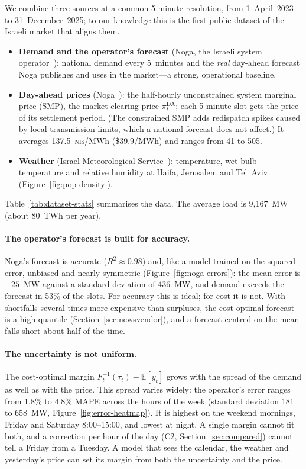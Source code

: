 We combine three sources at a common 5-minute resolution, from 1~April~2023
to 31~December~2025; to our knowledge this is the first public dataset of the
Israeli market that aligns them.

\begin{itemize}
    \item \textbf{Demand and the operator's forecast} (Noga, the Israeli
          system operator~\parencite{noga}): national demand every 5~minutes
          and the \emph{real} day-ahead forecast Noga publishes and uses in
          the market---a strong, operational baseline.
    \item \textbf{Day-ahead prices} (Noga~\parencite{noga_smp}): the
          half-hourly unconstrained system marginal price (SMP), the
          market-clearing price $\pi^{\mathrm{DA}}_t$; each 5-minute slot gets
          the price of its settlement period.  (The constrained SMP adds
          redispatch spikes caused by local transmission limits, which a
          national forecast does not affect.)  It averages
          137.5~\textsc{nis}/MWh (\$39.9/MWh) and ranges from 41 to 505.
    \item \textbf{Weather} (Israel Meteorological Service~\parencite{ims}):
          temperature, wet-bulb temperature and relative humidity at Haifa,
          Jerusalem and Tel~Aviv (Figure~\ref{fig:pop-density}).
\end{itemize}

Table~\ref{tab:dataset-stats} summarises the data.  The average load is
9{,}167~MW (about 80~TWh per year).

\paragraph*{The operator's forecast is built for accuracy.}  Noga's forecast
is accurate ($R^2\approx0.98$) and, like a model trained on the squared error,
unbiased and nearly symmetric (Figure~\ref{fig:noga-errors}): the mean error
is $+25$~MW against a standard deviation of 436~MW, and demand exceeds the
forecast in 53\% of the slots.  For accuracy this is ideal; for cost it is
not.  With shortfalls several times more expensive than surpluses, the
cost-optimal forecast is a high quantile (Section~\ref{sec:newsvendor}), and a
forecast centred on the mean falls short about half of the time.

\paragraph*{The uncertainty is not uniform.}  The cost-optimal margin
$F_t^{-1}(\tau_t)-\mathbb{E}[y_t]$ grows with the spread of the demand as
well as with the price.  This spread varies widely: the operator's error
ranges from 1.8\% to 4.8\% MAPE across the hours of the week (standard
deviation 181 to 658~MW, Figure~\ref{fig:error-heatmap}).  It is highest on
the weekend mornings, Friday and Saturday 8:00--15:00, and lowest at night.
A single margin cannot fit both, and a correction per hour of the day (C2,
Section~\ref{sec:compared}) cannot tell a Friday from a Tuesday.  A model
that sees the calendar, the weather and yesterday's price can set its margin
from both the uncertainty and the price.

